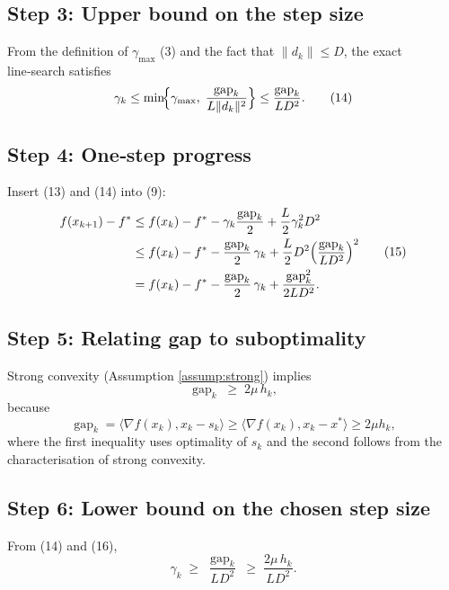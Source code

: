 \documentclass{article}
\newcommand{\gap}{\operatorname{gap}}
\begin{document}
\subsection*{Step 3: Upper bound on the step size}
From the definition of $\gamma_{\max}$ (3) and the fact that
$\|d_{k}\|\le D$, the exact line‑search satisfies
\[
\gamma_{k}\le \min\!\Bigl\{ \gamma_{\max},
\;\frac{\gap_{k}}{L\|d_{k}\|^{2}} \Bigr\}
\le \frac{\gap_{k}}{L D^{2}} .
\tag{14}
\]

\subsection*{Step 4: One‑step progress}
Insert (13) and (14) into (9):
\[
\begin{aligned}
f(x_{k+1})-f^{*}
&\le f(x_{k})-f^{*}
-\gamma_{k}\frac{\gap_{k}}{2}
+\frac{L}{2}\gamma_{k}^{2}D^{2}                                     \\
&\le f(x_{k})-f^{*}
-\frac{\gap_{k}}{2}\,\gamma_{k}
+\frac{L}{2}D^{2}\Bigl(\frac{\gap_{k}}{L D^{2}}\Bigr)^{2}            \\
&= f(x_{k})-f^{*}
-\frac{\gap_{k}}{2}\,\gamma_{k}
+\frac{\gap_{k}^{2}}{2L D^{2}} .
\end{aligned}
\tag{15}
\]

\subsection*{Step 5: Relating gap to suboptimality}
Strong convexity (Assumption \ref{assump:strong}) implies
\[
\gap_{k} \;\ge\; 2\mu\,h_{k},
\tag{16}
\]
because
\[
\gap_{k}= \langle \nabla f(x_{k}),x_{k}-s_{k}\rangle
\ge \langle \nabla f(x_{k}),x_{k}-x^{*}\rangle
\ge 2\mu h_{k},
\]
where the first inequality uses optimality of $s_{k}$ and the second follows from the
characterisation of strong convexity.

\subsection*{Step 6: Lower bound on the chosen step size}
From (14) and (16),
\[
\gamma_{k}\;\ge\; \frac{\gap_{k}}{L D^{2}}
\;\ge\; \frac{2\mu\,h_{k}}{L D^{2}} .
\tag{17}
\]
\end{document}
